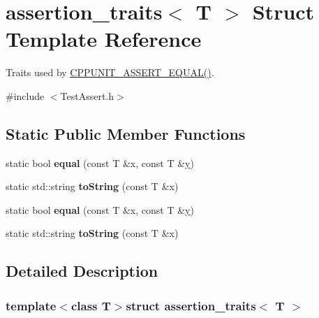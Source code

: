 \hypertarget{structassertion__traits}{\section{assertion\+\_\+traits$<$ T $>$ Struct Template Reference}
\label{structassertion__traits}
}


Traits used by \hyperlink{group___assertions_ga71162f05be07ef6817d156e77c68b1a3}{C\+P\+P\+U\+N\+I\+T\+\_\+\+A\+S\+S\+E\+R\+T\+\_\+\+E\+Q\+U\+A\+L()}.  




{\ttfamily \#include $<$Test\+Assert.\+h$>$}

\subsection*{Static Public Member Functions}
\begin{DoxyCompactItemize}
\item 
\hypertarget{structassertion__traits_a287c07a4e171256a0128201c7e4c4228}{static bool {\bfseries equal} (const T \&x, const T \&\hyperlink{_ice_utils_8h_aa7ffaed69623192258fb8679569ff9ba}{y})}\label{structassertion__traits_a287c07a4e171256a0128201c7e4c4228}

\item 
\hypertarget{structassertion__traits_a1c96296fb44902b4f22d99b9c3cc7749}{static std\+::string {\bfseries to\+String} (const T \&x)}\label{structassertion__traits_a1c96296fb44902b4f22d99b9c3cc7749}

\item 
\hypertarget{structassertion__traits_a287c07a4e171256a0128201c7e4c4228}{static bool {\bfseries equal} (const T \&x, const T \&\hyperlink{_ice_utils_8h_aa7ffaed69623192258fb8679569ff9ba}{y})}\label{structassertion__traits_a287c07a4e171256a0128201c7e4c4228}

\item 
\hypertarget{structassertion__traits_a1c96296fb44902b4f22d99b9c3cc7749}{static std\+::string {\bfseries to\+String} (const T \&x)}\label{structassertion__traits_a1c96296fb44902b4f22d99b9c3cc7749}

\end{DoxyCompactItemize}


\subsection{Detailed Description}
\subsubsection*{template$<$class T$>$struct assertion\+\_\+traits$<$ T $>$}

